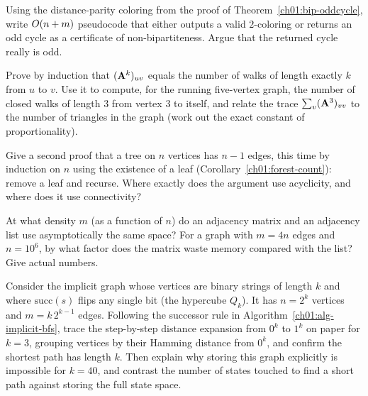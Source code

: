 \begin{exercise}
\label{ch01:ex-bipartite}
Using the distance-parity coloring from the proof of
Theorem~\ref{ch01:bip-oddcycle}, write $O(n+m)$ pseudocode that either outputs a
valid $2$-coloring or returns an odd cycle as a certificate of
non-bipartiteness. Argue that the returned cycle really is odd.
\end{exercise}

\begin{exercise}
\label{ch01:ex-matrixpower}
Prove by induction that $(\mathbf{A}^k)_{uv}$ equals the number of walks of length
exactly $k$ from $u$ to $v$. Use it to compute, for the running five-vertex
graph, the number of closed walks of length $3$ from vertex $3$ to itself, and
relate the trace $\sum_v (\mathbf{A}^3)_{vv}$ to the number of triangles in the
graph (work out the exact constant of proportionality).
\end{exercise}

\begin{exercise}
\label{ch01:ex-treecount}
Give a second proof that a tree on $n$ vertices has $n-1$ edges, this time by
induction on $n$ using the existence of a leaf
(Corollary~\ref{ch01:forest-count}): remove a leaf and recurse. Where exactly
does the argument use acyclicity, and where does it use connectivity?
\end{exercise}

\begin{exercise}
\label{ch01:ex-crossover}
At what density $m$ (as a function of $n$) do an adjacency matrix and an
adjacency list use asymptotically the same space? For a graph with $m = 4n$
edges and $n = 10^6$, by what factor does the matrix waste memory compared with
the list? Give actual numbers.
\end{exercise}

\begin{exercise}
\label{ch01:ex-implicit}
Consider the implicit graph whose vertices are binary strings of length $k$ and
where $\mathrm{succ}(s)$ flips any single bit (the hypercube $Q_k$). It has
$n = 2^k$ vertices and $m = k\,2^{k-1}$ edges. Following the successor rule
in Algorithm~\ref{ch01:alg-implicit-bfs}, trace the step-by-step distance
expansion from $0^k$ to $1^k$ on paper for $k = 3$, grouping vertices by their
Hamming distance from $0^k$, and confirm the shortest path has length $k$.
Then explain why storing this graph explicitly is impossible for $k = 40$,
and contrast the number of states touched to find a short path against storing
the full state space.
\end{exercise}
